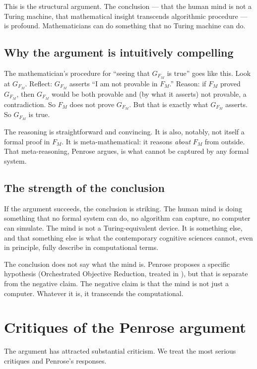 This is the structural argument. The conclusion --- that the human
mind is not a Turing machine, that mathematical insight transcends
algorithmic procedure --- is profound. Mathematicians can do
something that no Turing machine can do.

\subsection{Why the argument is intuitively compelling}

The mathematician's procedure for ``seeing that $G_{F_M}$ is true''
goes like this. Look at $G_{F_M}$. Reflect: $G_{F_M}$ asserts ``I
am not provable in $F_M$.'' Reason: if $F_M$ proved $G_{F_M}$, then
$G_{F_M}$ would be both provable and (by what it asserts) not
provable, a contradiction. So $F_M$ does not prove $G_{F_M}$. But
that is exactly what $G_{F_M}$ asserts. So $G_{F_M}$ is true.

The reasoning is straightforward and convincing. It is also,
notably, not itself a formal proof in $F_M$. It is meta-mathematical:
it reasons \emph{about} $F_M$ from outside. That meta-reasoning,
Penrose argues, is what cannot be captured by any formal system.

\subsection{The strength of the conclusion}

If the argument succeeds, the conclusion is striking. The human
mind is doing something that no formal system can do, no algorithm
can capture, no computer can simulate. The mind is not a
Turing-equivalent device. It is something else, and that
something else is what the contemporary cognitive sciences cannot,
even in principle, fully describe in computational terms.

The conclusion does not say what the mind is. Penrose proposes a
specific hypothesis (Orchestrated Objective Reduction, treated in
), but that is separate from the negative claim.
The negative claim is that the mind is not just a computer. Whatever
it is, it transcends the computational.

\section{Critiques of the Penrose argument}
\label{sec:penrose-critiques}

The argument has attracted substantial criticism. We treat the most
serious critiques and Penrose's responses.

